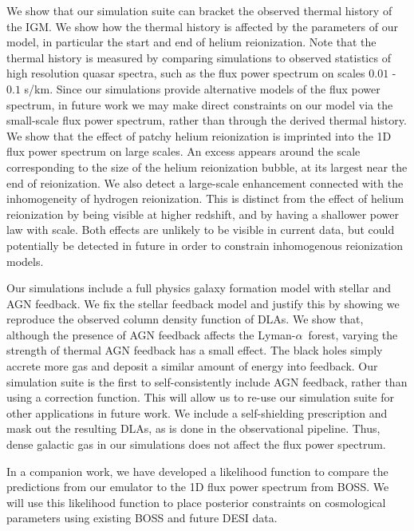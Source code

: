 \documentclass[a4paper,11pt]{article}
\newcommand{\Lya}{Lyman-$\alpha$}
\begin{document}
We show that our simulation suite can bracket the observed thermal history of the IGM. We show how the thermal history is affected by the parameters of our model, in particular the start and end of helium reionization. Note that the thermal history is measured by comparing simulations to observed statistics of high resolution quasar spectra, such as the flux power spectrum on scales $0.01$ - $0.1$ s/km. Since our simulations provide alternative models of the flux power spectrum, in future work we may make direct constraints on our model via the small-scale flux power spectrum, rather than through the derived thermal history. We show that the effect of patchy helium reionization is imprinted into the 1D flux power spectrum on large scales. An excess appears around the scale corresponding to the size of the helium reionization bubble, at its largest near the end of reionization. We also detect a large-scale enhancement connected with the inhomogeneity of hydrogen reionization. This is distinct from the effect of helium reionization by being visible at higher redshift, and by having a shallower power law with scale. Both effects are unlikely to be visible in current data, but could potentially be detected in future in order to constrain inhomogenous reionization models.

Our simulations include a full physics galaxy formation model with stellar and AGN feedback. We fix the stellar feedback model and justify this by showing we reproduce the observed column density function of DLAs. We show that, although the presence of AGN feedback affects the
\Lya~forest, varying the strength of thermal AGN feedback has a small effect. The black holes simply accrete more gas and deposit a similar amount of energy into feedback. Our simulation suite is the first to self-consistently include AGN feedback, rather than using a correction function. This will allow us to re-use our simulation suite for other applications in future work. We include a self-shielding prescription and mask out the resulting DLAs, as is done in the observational pipeline. Thus, dense galactic gas in our simulations does not affect the flux power spectrum.

In a companion work, we have developed a likelihood function to compare the predictions from our emulator to the 1D flux power spectrum from BOSS. We will use this likelihood function to place posterior constraints on cosmological parameters using existing BOSS and future DESI data.
\end{document}
